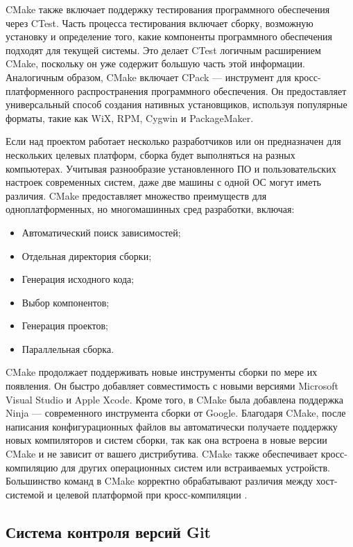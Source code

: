 CMake также включает поддержку тестирования программного обеспечения через CTest. Часть процесса тестирования включает сборку, возможную установку и определение того, какие компоненты программного обеспечения подходят для текущей системы. Это делает CTest логичным расширением CMake, поскольку он уже содержит большую часть этой информации. Аналогичным образом, CMake включает CPack — инструмент для кросс-платформенного распространения программного обеспечения. Он предоставляет универсальный способ создания нативных установщиков, используя популярные форматы, такие как WiX, RPM, Cygwin и PackageMaker.

Если над проектом работает несколько разработчиков или он предназначен для нескольких целевых платформ, сборка будет выполняться на разных компьютерах. Учитывая разнообразие установленного ПО и пользовательских настроек современных систем, даже две машины с одной ОС могут иметь различия. CMake предоставляет множество преимуществ для одноплатформенных, но многомашинных сред разработки, включая:
\begin{itemize}
	\item Автоматический поиск зависимостей;
	\item Отдельная директория сборки;
	\item Генерация исходного кода;
	\item Выбор компонентов;
	\item Генерация проектов;
	\item Параллельная сборка.
\end{itemize}

CMake продолжает поддерживать новые инструменты сборки по мере их появления. Он быстро добавляет совместимость с новыми версиями Microsoft Visual Studio и Apple Xcode. Кроме того, в CMake была добавлена поддержка Ninja — современного инструмента сборки от Google. Благодаря CMake, после написания конфигурационных файлов вы автоматически получаете поддержку новых компиляторов и систем сборки, так как она встроена в новые версии CMake и не зависит от вашего дистрибутива. CMake также обеспечивает кросс-компиляцию для других операционных систем или встраиваемых устройств. Большинство команд в CMake корректно обрабатывают различия между хост-системой и целевой платформой при кросс-компиляции \cite{CMake}.

\subsection{Система контроля версий Git}

